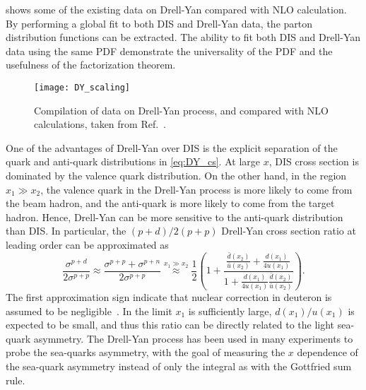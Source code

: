 \documentclass[../main.tex]{subfiles}
\begin{document}
 shows some of the existing data on Drell-Yan compared with NLO calculation. By
performing a global fit to both DIS and Drell-Yan data, the parton distribution
functions can be extracted. The ability to fit both DIS and Drell-Yan data using
the same PDF demonstrate the universality of the PDF and the usefulness of the
factorization theorem.
\begin{figure}[htbp!]
	\centering
	\texttt{[image: DY\_scaling]}
	\caption{Compilation of data on Drell-Yan process, and compared with NLO calculations,
		taken from Ref.~\cite{mcgaughey1999}.}
	\label{fig:DY_scaling}
\end{figure}

One of the advantages of Drell-Yan over DIS is the explicit separation of the quark
and anti-quark distributions in \cref{eq:DY_cs}. At large $x$, DIS cross section
is dominated by the valence quark distribution. On the other hand, in the region $x_1 \gg x_2$,
the valence quark in the Drell-Yan process is more likely to come from the beam
hadron, and the anti-quark is more likely to come from the target hadron. Hence,
Drell-Yan can be more sensitive to the anti-quark distribution than DIS. In
particular, the $(p+d)/2(p+p)$ Drell-Yan cross section ratio at leading order
can be approximated as
\begin{equation}
	\frac{\sigma^{p+d}}{2\sigma^{p+p}}\approx \frac{\sigma^{p+p}+\sigma^{p+n}}{2\sigma^{p+p}}
	\stackrel{x_1\gg x_2}{\approx} \frac{1}{2} \left( 1+ \frac{\frac{\bar{d}\left(x_2\right)}{\bar{u}\left(x_2\right)} + \frac{d\left(x_1\right)}{4u\left(x_1\right)} }{1+\frac{d\left(x_1\right)}{4u\left(x_1\right)} \frac{\bar{d}\left(x_2\right)}{\bar{u}\left(x_2\right)} }\right).
\end{equation}
The first approximation sign indicate that nuclear correction in deuteron is assumed to be negligible~\cite{ehlers2014}.
In the limit $x_1$ is sufficiently large, $d\left(x_1\right)/u\left(x_1\right)$ is expected
to be small, and thus this ratio can be directly related to the light sea-quark
asymmetry. The Drell-Yan process has been used in many experiments to probe the sea-quarks
asymmetry, with the goal of measuring the $x$ dependence of the sea-quark asymmetry
instead of only the integral as with the Gottfried sum rule.
\end{document}
